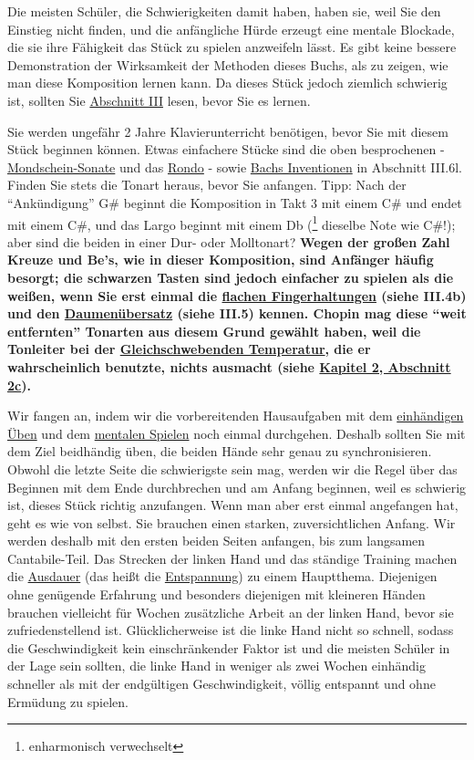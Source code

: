 Die meisten Schüler, die Schwierigkeiten damit haben, haben sie, weil Sie den Einstieg nicht finden, und die anfängliche Hürde erzeugt eine mentale Blockade, die sie ihre Fähigkeit das Stück zu spielen anzweifeln lässt.
Es gibt keine bessere Demonstration der Wirksamkeit der Methoden dieses Buchs, als zu zeigen, wie man diese Komposition lernen kann.
Da dieses Stück jedoch ziemlich schwierig ist, sollten Sie \hyperref[c1iii1]{Abschnitt III} lesen, bevor Sie es lernen.

Sie werden ungefähr 2 Jahre Klavierunterricht benötigen, bevor Sie mit diesem Stück beginnen können.
Etwas einfachere Stücke sind die oben besprochenen - \hyperref[c1ii25b]{Mondschein-Sonate} und das \hyperref[c1ii25c]{Rondo} - sowie \hyperref[c1iii6l2]{Bachs Inventionen} in Abschnitt III.6l.
Finden Sie stets die Tonart heraus, bevor Sie anfangen.
Tipp: Nach der \enquote{Ankündigung} G\# beginnt die Komposition in Takt 3 mit einem C\# und endet mit einem C\#, und das Largo beginnt mit einem Db (\footnote{enharmonisch verwechselt} dieselbe Note wie C\#!); aber sind die beiden in einer Dur- oder Molltonart?
\textbf{Wegen der großen Zahl Kreuze und Be's, wie in dieser Komposition, sind Anfänger häufig besorgt;
die schwarzen Tasten sind jedoch einfacher zu spielen als die weißen, wenn Sie erst einmal die \hyperref[c1iii4b]{flachen Fingerhaltungen} (siehe III.4b) und den \hyperref[c1iii5b]{Daumenübersatz} (siehe III.5) kennen.
Chopin mag diese \enquote{weit entfernten} Tonarten aus diesem Grund gewählt haben, weil die Tonleiter bei der \hyperref[et1]{Gleichschwebenden Temperatur}, die er wahrscheinlich benutzte, nichts ausmacht (siehe \hyperref[c2_2c]{Kapitel 2, Abschnitt 2c}).}

Wir fangen an, indem wir die vorbereitenden Hausaufgaben mit dem \hyperref[c1ii7]{einhändigen Üben} und dem \hyperref[c1ii12mental]{mentalen Spielen} noch einmal durchgehen.
Deshalb sollten Sie mit dem Ziel beidhändig üben, die beiden Hände sehr genau zu synchronisieren.
Obwohl die letzte Seite die schwierigste sein mag, werden wir die Regel über das Beginnen mit dem Ende durchbrechen und am Anfang beginnen, weil es schwierig ist, dieses Stück richtig anzufangen.
Wenn man aber erst einmal angefangen hat, geht es wie von selbst.
Sie brauchen einen starken, zuversichtlichen Anfang.
Wir werden deshalb mit den ersten beiden Seiten anfangen, bis zum langsamen Cantabile-Teil.
Das Strecken der linken Hand und das ständige Training machen die \hyperref[c1ii21]{Ausdauer} (das heißt die \hyperref[c1ii14]{Entspannung}) zu einem Hauptthema.
Diejenigen ohne genügende Erfahrung und besonders diejenigen mit kleineren Händen brauchen vielleicht für Wochen zusätzliche Arbeit an der linken Hand, bevor sie zufriedenstellend ist.
Glücklicherweise ist die linke Hand nicht so schnell, sodass die Geschwindigkeit kein einschränkender Faktor ist und die meisten Schüler in der Lage sein sollten, die linke Hand in weniger als zwei Wochen einhändig schneller als mit der endgültigen Geschwindigkeit, völlig entspannt und ohne Ermüdung zu spielen.


